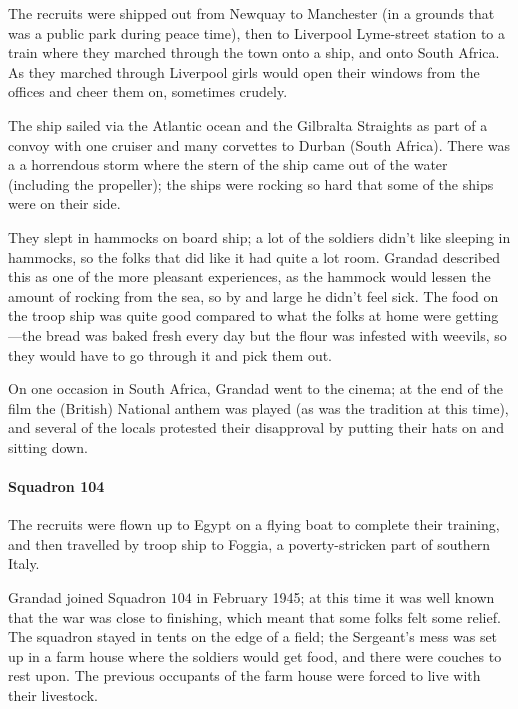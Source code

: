 The recruits were shipped out from Newquay to Manchester (in a grounds that was a public park during peace
time), then to Liverpool Lyme-street station to a train where they marched through the town onto a ship,
and onto South Africa.  As they marched through Liverpool girls would open their windows from the offices and
cheer them on, sometimes crudely.

The ship sailed via the Atlantic ocean and the Gilbralta Straights as part of a convoy with one cruiser and many corvettes to Durban (South Africa).
There was a a horrendous storm where the stern of the ship came out of the water (including the propeller);
the ships were rocking so hard that some of the ships were on their side.

They slept in hammocks on board ship; a lot of the soldiers
didn't like sleeping in hammocks, so the folks that did like it had quite a lot room. Grandad described this as
one of the more pleasant experiences, as the hammock would lessen the amount of rocking from the
sea, so by and large he didn't feel sick. The food on the troop ship was quite good compared
to what the folks at home were getting---the bread was baked fresh every day but the flour was
infested with weevils, so they would have to go through it and pick them out.

\begin{figure}
	\centering
\end{figure}
On one occasion in South Africa, Grandad went to the cinema; at the end of the film
the (British) National anthem was played (as was the tradition at this time), and several of the
locals protested their disapproval by putting their hats on and sitting down.

\paragraph{Squadron 104} The recruits were flown up to Egypt on a flying boat to complete their training, and
then travelled by troop ship to Foggia, a poverty-stricken part of southern Italy.

Grandad joined Squadron $104$ in February 1945; at this time it was well known that
the war was close to finishing, which meant that some folks felt some relief. The
squadron stayed in tents on the edge of a field; the Sergeant's mess was set up
in a farm house where the soldiers would get food, and there were couches to rest upon.
The previous occupants of the farm house were forced to live with their livestock.

